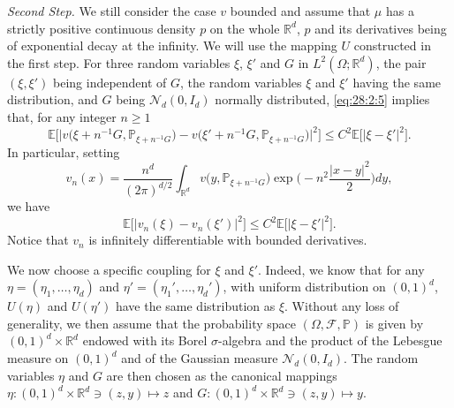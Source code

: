 \documentclass[11pt]{amsart}
\begin{document}
\textit{Second Step.} We still consider the case $v$ bounded and assume that $\mu$ has a strictly positive continuous density $p$ on the whole ${\mathbb R}^d$, $p$ and its derivatives being of exponential decay at the infinity. We will use the mapping $U$ constructed in the first step. 
For three random variables $\xi$, $\xi'$ and $G$ in $L^2(\Omega;{\mathbb R}^d)$, the pair $(\xi,\xi')$ being independent of $G$, the random variables 
$\xi$ and $\xi'$ having the same distribution, and $G$ being ${\mathcal N}_{d}(0,I_{d})$ normally distributed, \eqref{eq:28:2:5} implies that, for any integer $n \geq 1$
\begin{equation*}
{\mathbb E} \bigl[ \vert v\bigl(\xi+ n^{-1} G,{\mathbb P}_{\xi + n^{-1} G}\bigr)
- v\bigl(\xi'+ n^{-1} G,{\mathbb P}_{\xi + n^{-1} G}\bigr) \vert^2 \bigr] \leq C^2 {\mathbb E} \bigl[ \vert \xi - \xi' \vert^2 \bigr].
\end{equation*}
In particular, setting 
\begin{equation*}
v_{n}(x) = \frac{n^d}{(2 \pi)^{d/2}}\int_{{\mathbb R}^d} v\bigl(y,{\mathbb P}_{\xi + n^{-1} G}\bigr) \exp \bigl( -n^2 \frac{ \vert x - y \vert^2}{2} \bigr) dy,
\end{equation*}
we have
\begin{equation}
\label{eq:25:3:2}
{\mathbb E} \bigl[ \vert v_{n}(\xi) - v_{n}(\xi') \vert^2 \bigr] \leq C^2 {\mathbb E} \bigl[ \vert \xi - \xi' \vert^2 \bigr].
\end{equation}
Notice that $v_{n}$ is infinitely differentiable with bounded derivatives. 

We now choose a specific coupling for $\xi$ and $\xi'$. Indeed, we know that for any $ \eta=(\eta_1,\dots,\eta_{d})$ and 
$\eta'=(\eta_{1}',\dots,\eta_{d}')$, with uniform distribution on $(0,1)^d$, $U( \eta)$ and $U(\eta')$ have the same distribution as $\xi$. Without any loss of generality, we then assume that the probability space $(\Omega,{\mathcal F},{\mathbb P})$ is given by 
$(0,1)^d \times {\mathbb R}^d$ endowed with its Borel $\sigma$-algebra and the product of the Lebesgue measure on $(0,1)^d$ and 
of the Gaussian measure ${\mathcal N}_{d}(0,I_{d})$. The random variables $\eta$ and $G$ are then chosen as
the canonical mappings  
$\eta : (0,1)^d \times {\mathbb R}^d \ni (z,y) \mapsto z$ and $G : (0,1)^d \times {\mathbb R}^d \ni (z,y) \mapsto y$.
\end{document}
